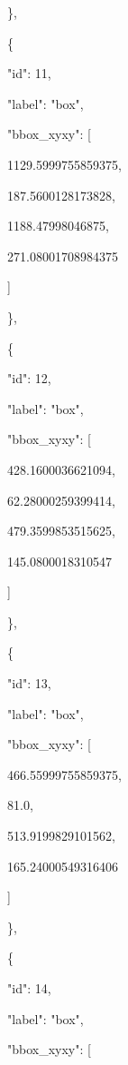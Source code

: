 \documentclass[10pt,a4paper]{article}
\begin{document}
    \},\allowbreak{}\par
    \{\par
      "id":\allowbreak{} 11,\allowbreak{}\par
      "label":\allowbreak{} "box",\allowbreak{}\par
      "bbox\_xyxy":\allowbreak{} [\par
        1129.5999755859375,\allowbreak{}\par
        187.5600128173828,\allowbreak{}\par
        1188.47998046875,\allowbreak{}\par
        271.08001708984375\par
      ]\par
    \},\allowbreak{}\par
    \{\par
      "id":\allowbreak{} 12,\allowbreak{}\par
      "label":\allowbreak{} "box",\allowbreak{}\par
      "bbox\_xyxy":\allowbreak{} [\par
        428.1600036621094,\allowbreak{}\par
        62.28000259399414,\allowbreak{}\par
        479.3599853515625,\allowbreak{}\par
        145.0800018310547\par
      ]\par
    \},\allowbreak{}\par
    \{\par
      "id":\allowbreak{} 13,\allowbreak{}\par
      "label":\allowbreak{} "box",\allowbreak{}\par
      "bbox\_xyxy":\allowbreak{} [\par
        466.55999755859375,\allowbreak{}\par
        81.0,\allowbreak{}\par
        513.9199829101562,\allowbreak{}\par
        165.24000549316406\par
      ]\par
    \},\allowbreak{}\par
    \{\par
      "id":\allowbreak{} 14,\allowbreak{}\par
      "label":\allowbreak{} "box",\allowbreak{}\par
      "bbox\_xyxy":\allowbreak{} [\par
\end{document}
